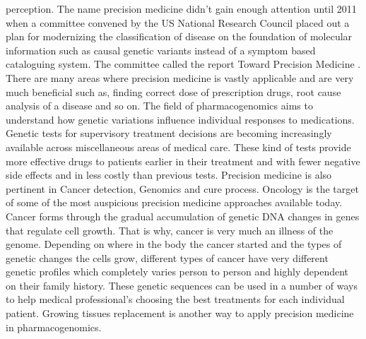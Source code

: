 \documentclass[sigconf]{acmart}
\begin{document}
perception\cite{editor03}. The name precision medicine didn’t gain enough attention until 2011 when a committee convened by the US National Research Council placed out a plan for modernizing the classification of disease on the foundation of molecular information such as causal genetic variants instead of a symptom based cataloguing system. The committee called the report Toward Precision Medicine \cite{editor02}. There are many areas where precision medicine is vastly applicable and are very much beneficial such as, finding correct dose of prescription drugs, root cause analysis of a disease and so on. The field of pharmacogenomics aims to understand how genetic variations influence individual responses to medications. Genetic tests for supervisory treatment decisions are becoming increasingly available across miscellaneous areas of medical care. These kind of tests provide more effective drugs to patients earlier in their treatment and with fewer negative side effects and in less costly than previous tests. Precision medicine is also pertinent in Cancer detection, Genomics and cure process. Oncology is the target of some of the most auspicious precision medicine approaches available today. Cancer forms through the gradual accumulation of genetic DNA changes in genes that regulate cell growth. That is why, cancer is very much an illness of the genome. Depending on where in the body the cancer started and the types of genetic changes the cells grow, different types of cancer have very different genetic profiles which completely varies person to person and highly dependent on their family history. These genetic sequences can be used in a number of ways to help medical professional’s choosing the best treatments for each individual patient. Growing tissues replacement is another way to apply precision medicine in pharmacogenomics\cite{editor02}. 
\end{document}
